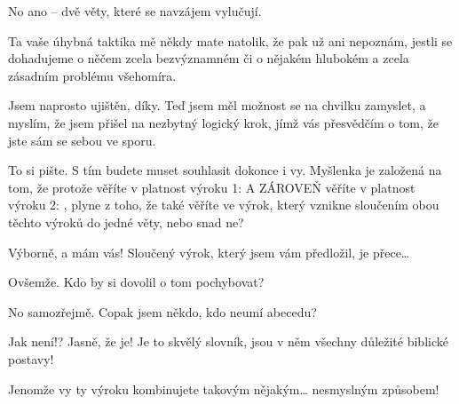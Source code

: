 \documentclass[12pt]{article}
\begin{document}
\begin{description}[itemsep=0pt]
\item[Ž:]

\item[A:] No ano -- dvě věty, které se navzájem vylučují.

\item[Ž:]

\item[A:] Ta vaše úhybná taktika mě někdy mate natolik, že pak už ani nepoznám,
    jestli se dohadujeme o něčem zcela bezvýznamném či o nějakém hlubokém a zcela
    zásadním problému všehomíra.

\item[Ž:]

\item[A:] Jsem naprosto ujištěn, díky. Teď jsem měl možnost se na chvilku
    zamyslet, a myslím, že jsem přišel na nezbytný logický krok, jímž
    vás přesvědčím o tom, že jste sám se sebou ve sporu.

\item[Ž:]

\item[A:] To si pište. S tím budete muset souhlasit dokonce i vy. Myšlenka
    je založená na tom, že protože věříte v platnost výroku 1:  A ZÁROVEŇ věříte v platnost výroku 2: ,
    plyne z toho, že také věříte ve výrok, který vznikne sloučením obou těchto
    výroků do jedné věty, nebo snad ne?

\item[Ž:]

\item[A:] Výborně, a mám vás! Sloučený výrok, který jsem vám předložil,
    je přece…

\item[Ž:]

\item[A:] Ovšemže. Kdo by si dovolil o tom pochybovat?

\item[Ž:]

\item[A:] No samozřejmě. Copak jsem někdo, kdo neumí abecedu?

\item[Ž:]

\item[A:] Jak není!? Jasně, že je! Je to skvělý slovník, jsou v něm všechny
    důležité biblické postavy!

\item[Ž:]

\item[A:] Jenomže vy ty výroku kombinujete takovým nějakým… nesmyslným způsobem!


\end{description}
\end{document}
